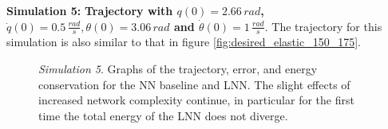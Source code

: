 \documentclass[a4paper]{article}
\begin{document}
\textbf{Simulation 5:} \textbf{Trajectory with $q(0)=2.66\, rad$, $\dot{q}(0)=0.5\, \frac{rad}{s}, \theta(0)=3.06\, rad$ and $\dot{\theta}(0)=1\, \frac{rad}{s}.$}
The trajectory for this simulation is also similar to that in figure \ref{fig:desired_elastic_150_175}.

\begin{figure}
    \centering
    \qquad
    \caption{\textit{Simulation 5}. Graphs of the trajectory, error, and energy conservation for the NN baseline and LNN. The slight effects of increased network complexity continue, in particular for the first time the total energy of the LNN does not diverge.}
    \label{fig:elastic_700_150_175}
\end{figure}
\end{document}

